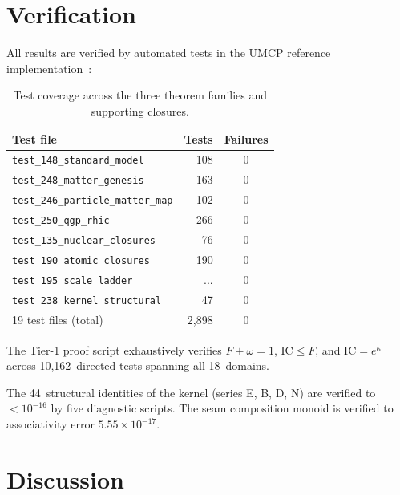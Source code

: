 \documentclass[
  aps,
  prd,
  twocolumn,
  superscriptaddress,
  nofootinbib,
  floatfix
]{revtex4-2}
\newcommand{\IC}{\mathrm{IC}}
\begin{document}
\section{Verification}\label{sec:verification}

All results are verified by automated tests in the
UMCP reference implementation~\cite{umcpmetadatarepo}:

\begin{table}[h]
\caption{\label{tab:tests}Test coverage across the three
theorem families and supporting closures.}
\begin{ruledtabular}
\begin{tabular}{lrc}
Test file & Tests & Failures \\
\hline
\texttt{test\_148\_standard\_model} & 108 & 0 \\
\texttt{test\_248\_matter\_genesis} & 163 & 0 \\
\texttt{test\_246\_particle\_matter\_map} & 102 & 0 \\
\texttt{test\_250\_qgp\_rhic} & 266 & 0 \\
\texttt{test\_135\_nuclear\_closures} & 76 & 0 \\
\texttt{test\_190\_atomic\_closures} & 190 & 0 \\
\texttt{test\_195\_scale\_ladder} & ... & 0 \\
\texttt{test\_238\_kernel\_structural} & 47 & 0 \\
19 test files (total) & 2{,}898 & 0 \\
\end{tabular}
\end{ruledtabular}
\end{table}

The Tier-1 proof script exhaustively verifies
$F + \omega = 1$, $\IC \leq F$, and $\IC = e^{\kappa}$
across 10{,}162~directed tests spanning all 18~domains.

The 44~structural identities of the kernel (series E, B, D, N)
are verified to $< 10^{-16}$ by five diagnostic scripts.
The seam composition monoid is verified to associativity error
$5.55 \times 10^{-17}$.

\section{Discussion}\label{sec:discussion}
\end{document}
